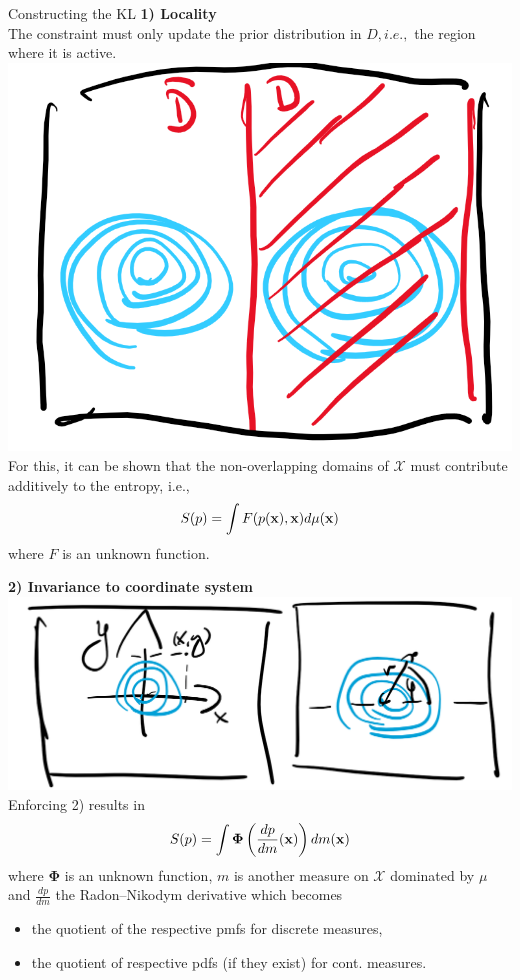 \documentclass[11pt,compress,t,notes=noshow, xcolor=table]{beamer}
\begin{document}
\begin{vbframe}{Constructing the KL}
    \textbf{1) Locality} \\
    The constraint must only update the prior distribution in $D, i.e.,$ the region where it is active. \\
\includegraphics[width=0.3\linewidth]{figure_man/kl_me_constraint.png} \\
    \lz
    For this, it can be shown that the non-overlapping domains of $\mathcal{X}$ must contribute additively to the entropy, i.e.,
    $$S(p) = \int F(p(\mathbf{x}), \mathbf{x}) d\mu(\mathbf{x})$$
    where $F$ is an unknown function.
    
    \framebreak
    
    \textbf{2) Invariance to coordinate system} \\
    \lz 
    \includegraphics[width=0.5\linewidth]{figure_man/kl_me_cosy.png} \\
    Enforcing 2) results in 
    $$S(p) = \int \bm{\Phi}\left(\frac{dp}{dm}(\mathbf{x})\right)dm(\mathbf{x})$$
    where $\bm{\Phi}$ is an unknown function, $m$ is another measure on $\mathcal{X}$ dominated by $\mu$ and $\frac{dp}{dm}$ the Radon–Nikodym derivative which becomes 
    \begin{itemize}
        \item the quotient of the respective pmfs for discrete measures,
        \item the quotient of respective pdfs (if they exist) for cont. measures.
    \end{itemize} 

    \framebreak


\end{vbframe}
\end{document}
